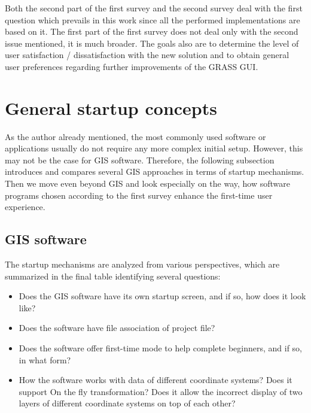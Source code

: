 \documentclass[a4paper,10pt,twoside]{article}
\begin{document}
\noindent Both the second part of the first survey and the second survey deal with the first question which prevails in this work since all the performed implementations are based on it. The first part of the first survey does not deal only with the second issue mentioned, it is much broader. The goals also are to determine the level of user satisfaction / dissatisfaction with the new solution and to obtain general user preferences regarding further improvements of the GRASS GUI.

\newpage
\vspace*{-1cm}
\section{General startup concepts}
\label{sec:startup_concepts}
\noindent
\large
As the author already mentioned, the most commonly used software or applications usually do not require any more complex initial setup. However, this may not be the case for GIS software. Therefore, the following subsection introduces and compares several GIS approaches in terms of startup mechanisms. Then we move even beyond GIS and look especially on the way, how software programs chosen according to the first survey enhance the first-time user experience.

\subsection{GIS software}
\label{subsection:GIS software}

The startup mechanisms are analyzed from various perspectives, which are summarized in the final table identifying several questions:
\begin{itemize}
\item Does the GIS software have its own startup screen, and if so, how does it look like? 
\item Does the software have file association of project file?
\item Does the software offer first-time mode to help complete beginners, and if so, in what form?
\item How the software works with data of different coordinate systems? Does it support On the fly transformation? Does it allow the incorrect display of two layers of different coordinate systems on top of each other?
\end{itemize}
\end{document}
